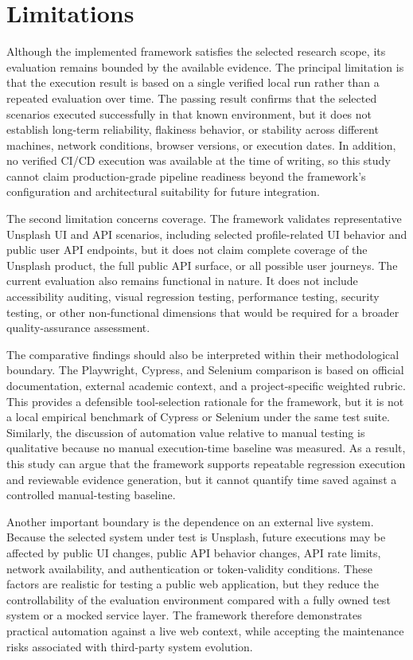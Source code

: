 \section{Limitations}
\label{sec:ch6-limitations}

Although the implemented framework satisfies the selected research scope, its evaluation remains bounded by the available evidence. The principal limitation is that the execution result is based on a single verified local run rather than a repeated evaluation over time. The passing result confirms that the selected scenarios executed successfully in that known environment, but it does not establish long-term reliability, flakiness behavior, or stability across different machines, network conditions, browser versions, or execution dates. In addition, no verified CI/CD execution was available at the time of writing, so this study cannot claim production-grade pipeline readiness beyond the framework's configuration and architectural suitability for future integration.

The second limitation concerns coverage. The framework validates representative Unsplash UI and API scenarios, including selected profile-related UI behavior and public user API endpoints, but it does not claim complete coverage of the Unsplash product, the full public API surface, or all possible user journeys. The current evaluation also remains functional in nature. It does not include accessibility auditing, visual regression testing, performance testing, security testing, or other non-functional dimensions that would be required for a broader quality-assurance assessment.

The comparative findings should also be interpreted within their methodological boundary. The Playwright, Cypress, and Selenium comparison is based on official documentation, external academic context, and a project-specific weighted rubric. This provides a defensible tool-selection rationale for the framework, but it is not a local empirical benchmark of Cypress or Selenium under the same test suite. Similarly, the discussion of automation value relative to manual testing is qualitative because no manual execution-time baseline was measured. As a result, this study can argue that the framework supports repeatable regression execution and reviewable evidence generation, but it cannot quantify time saved against a controlled manual-testing baseline.

Another important boundary is the dependence on an external live system. Because the selected system under test is Unsplash, future executions may be affected by public UI changes, public API behavior changes, API rate limits, network availability, and authentication or token-validity conditions. These factors are realistic for testing a public web application, but they reduce the controllability of the evaluation environment compared with a fully owned test system or a mocked service layer. The framework therefore demonstrates practical automation against a live web context, while accepting the maintenance risks associated with third-party system evolution.

